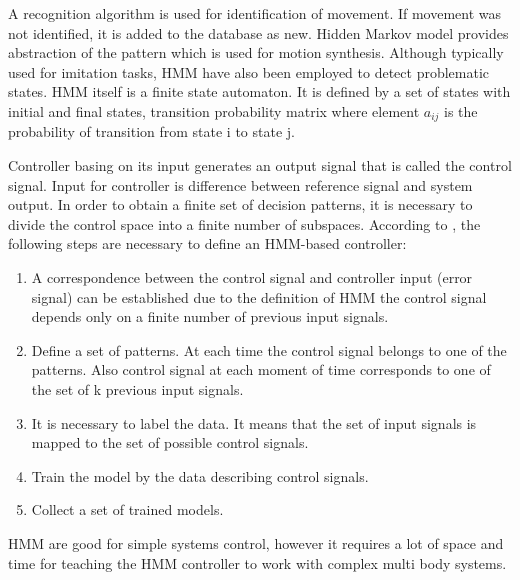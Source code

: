 \documentclass[12pt,a4paper]{report}
\begin{document}
			A recognition algorithm is used for identification of movement. If movement was not identified, it is added to the database as new. Hidden Markov model provides abstraction of the pattern which is used for motion synthesis. Although typically used for imitation tasks, HMM have also been employed to detect problematic states.	HMM itself is a finite state automaton. It is defined by a set of states with initial and final states, transition probability matrix where element $a_{ij}$ is the probability of transition from state i to state j.
			
			 Controller basing on its input generates an output signal that is called the control signal. Input for controller is difference between reference signal and system output. In order to obtain a finite set of decision patterns, it is necessary to divide the control space into a finite number of subspaces. According to  \cite{yang1994hidden}, the following steps are necessary to define an HMM-based controller:
			
			\begin{enumerate}
				\item
					A correspondence  between the control signal and controller input (error signal) can be established due to the definition of HMM the control signal depends only on a finite number of previous input signals.
				\item 
					Define a set of patterns. At each time the control signal belongs to one of the patterns. Also control signal at each moment of time corresponds to one of the set of k previous input signals.
				\item
					It is necessary to label the data. It means that the set of input signals is mapped to the set of possible control signals.
				\item
					Train the model by the data describing control signals.
				\item
					Collect a set of trained models.
			\end{enumerate} 
			
			HMM are good for simple systems control, however it requires a lot of space and time for teaching the HMM controller to work with complex multi body systems.
			
\end{document}
